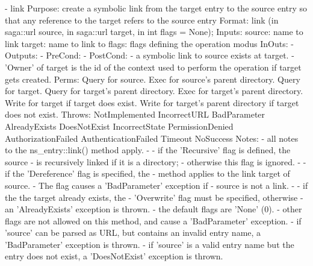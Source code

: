 \begin{myspec}
 
    - link
      Purpose:  create a symbolic link from the target entry to
                the source entry so that any reference to the
                target refers to the source entry
      Format:   link               (in  saga::url  source,
                                    in  saga::url  target,
                                    in  int     flags = None);
      Inputs:   source:             name to link
                target:             name to link to
                flags:              flags defining the operation
                                    modus
      InOuts:   -
      Outputs:  -
      PreCond:  -
      PostCond: - a symbolic link to source exists at target.
                - 'Owner' of target is the id of the context
                  used to perform the operation if target gets
                  created.
      Perms:    Query for source.
                Exec  for source's parent directory.
                Query for target.
                Query for target's parent directory.
                Exec  for target's parent directory.
                Write for target
                      if  target does exist.
                Write for target's parent directory 
                      if  target does not exist.
      Throws:   NotImplemented
                IncorrectURL
                BadParameter
                AlreadyExists
                DoesNotExist
                IncorrectState
                PermissionDenied
                AuthorizationFailed
                AuthenticationFailed
                Timeout
                NoSuccess
      Notes:    - all notes to the ns_entry::link() method
                  apply.
-               - if the 'Recursive' flag is defined, the source
-                 is recursively linked if it is a directory;
-                 otherwise this flag is ignored.
-               - if the 'Dereference' flag is specified, the
-                 method applies to the link target of source.
-                 The flag causes a 'BadParameter' exception if
-                 source is not a link.
-               - if the the target already exists, the 
-                 'Overwrite' flag must be specified, otherwise
-                 an 'AlreadyExists' exception is thrown.
                - the default flags are 'None' (0).
                - other flags are not allowed on this method, 
                  and cause a 'BadParameter' exception.
                - if 'source' can be parsed as URL, but contains 
                  an invalid entry name, a 'BadParameter'
                  exception is thrown.
                - if 'source' is a valid entry name but the entry
                  does not exist, a 'DoesNotExist' exception is
                  thrown.
 

\end{myspec}
